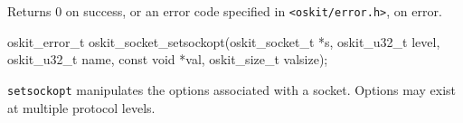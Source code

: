 \begin{apiret}
        Returns 0 on success, or an error code specified in
        {\tt <oskit/error.h>}, on error.
\end{apiret}

\begin{apisyn}

        \funcproto oskit_error_t
        oskit_socket_setsockopt(oskit_socket_t *s,
		 oskit_u32_t level,
		 oskit_u32_t name, 
		 const void *val, 
		 oskit_size_t valsize);
\end{apisyn}

\begin{apidesc}
	\texttt{setsockopt} manipulates the options
	associated with a socket.  Options may exist at multiple protocol 
	levels. 

\end{apidesc}


